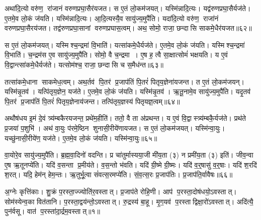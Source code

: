 अथा॑दि॒त्यो वरु॑ण॒ रा॑जानं वरुणप्रघा॒सैर॑यजत।
स ए॒तं लो॒कम॑जयत्।
यस्मि॑न्नादि॒त्यः।
यद्व॑रुणप्रघा॒सैर्यज॑ते।
ए॒तमे॒व लो॒कं ज॑यति।
यस्मि॑न्नादि॒त्यः।
आ॒दि॒त्यस्यै॒व सायु॑ज्य॒मुपै॑ति।
यदा॑दि॒त्यो वरु॑ण॒ राजा॑नं वरुणप्रघा॒सै\-रय॑जत।
तद्व॑रुणप्रघा॒सानां वरुणप्रघास॒त्वम्।
अथ॒ सोमो॒ राजा॒ छन्दासि साकमे॒धैर॑यजत॥६२॥

स ए॒तं लो॒कम॑जयत्।
यस्मिश्च॒न्द्रमा॑ वि॒भाति॑।
यत्सा॑कमे॒धैर्यज॑ते।
ए॒तमे॒व लो॒कं ज॑यति।
यस्मिश्च॒न्द्रमा॑ वि॒भाति॑।
च॒न्द्रम॑स ए॒व सायु॑ज्य॒मुपै॑ति।
सोमो॒ वै च॒न्द्रमा।
ए॒ष ह॒ त्वै सा॒क्षात्सोमं॑ भक्षयति।
य ए॒वं वि॒द्वान्त्सा॑कमे॒धैर्यज॑ते।
यत्सोम॑श्च॒ राजा॒ छन्दासि च स॒मैध॑न्त॥६३॥

तत्सा॑कमे॒धाना साकमेध॒त्वम्।
अथ॒र्तव॑ पि॒तर॑ प्र॒जाप॑तिं पि॒तरं॑ पितृय॒ज्ञेना॑यजन्त।
त ए॒तं लो॒कम॑जयन्।
यस्मि॑न्नृ॒तव॑।
यत्पि॑तृय॒ज्ञेन॒ यज॑ते।
ए॒तमे॒व लो॒कं ज॑यति।
यस्मि॑न्नृ॒तव॑।
ऋ॒तू॒नामे॒व सायु॑ज्य॒मुपै॑ति।
यदृ॒तव॑ पि॒तर॑ प्र॒जाप॑तिं पि॒तरं॑ पितृय॒ज्ञेनाय॑जन्त।
तत्पि॑तृय॒ज्ञस्य॑ पितृयज्ञ॒त्वम्॥६४॥

अथौष॑धय इ॒मं दे॒वं त्र्य॑म्बकैरयजन्त॒ प्रथे॑म॒हीति॑।
ततो॒ वै ता अ॑प्रथन्त।
य ए॒वं वि॒द्वास्त्र्य॑म्बकै॒र्यज॑ते।
प्रथ॑ते प्र॒जया॑ प॒शुभि॑।
अथ॑ वा॒युः प॑रमे॒ष्ठिन शुनासी॒रीये॑णायजत।
स ए॒तं लो॒कम॑जयत्।
यस्मि॑न्वा॒युः।
यच्छु॑नासी॒रीये॑ण॒ यज॑ते।
ए॒तमे॒व लो॒कं ज॑यति।
यस्मि॑न्वा॒युः॥६५॥

वा॒योरे॒व सायु॑ज्य॒मुपै॑ति।
ब्र॒ह्म॒वा॒दिनो॑ वदन्ति।
प्र चा॑तुर्मास्यया॒जी मी॑य॒ता (३) न प्रमी॑य॒ता (३) इति॑।
जीव॒न्वा ए॒ष ऋ॒तूनप्ये॑ति।
यदि॑ व॒सन्ता प्र॒मीय॑ते।
व॒स॒न्तो भ॑वति।
यदि॑ ग्री॒ष्मे ग्री॒ष्मः।
यदि॑ व॒र्॒षासु॑ व॒र्॒षाः।
यदि॑ श॒रदि॑ श॒रत्।
यदि॒ हेम॑न् हेम॒न्तः।
ऋ॒तुर्भू॒त्वा सं॑वत्स॒रमप्ये॑ति।
सं॒व॒त्स॒रः प्र॒जाप॑तिः।
प्र॒जाप॑ति॒र्वावैषः॥६६॥






\clearpage
{}
\setcounter{anuvakam}{0}

अ॒ग्नेः कृत्ति॑काः।
शु॒क्रं प॒रस्ता॒ज्ज्योति॑र॒वस्तात्।
प्र॒जाप॑ते रोहि॒णी।
आप॑ प॒रस्ता॒दोष॑धयो॒ऽवस्तात्।
सोम॑स्येन्व॒का वित॑तानि।
प॒रस्ता॒द्वय॑न्तो॒ऽवस्तात्।
रु॒द्रस्य॑ बा॒हू।
मृ॒ग॒यव॑ प॒रस्ताद्विक्षा॒रो॑ऽवस्तात्।
अदि॑त्यै॒ पुन॑र्वसू।
वात॑ प॒रस्ता॑दा॒र्द्रम॒वस्तात्॥१॥

